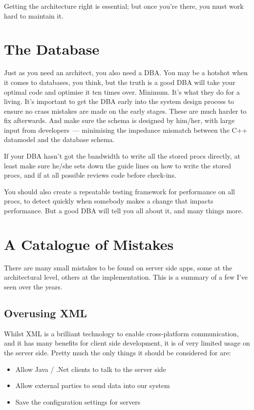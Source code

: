 \documentclass{book}
\begin{document}
Getting the architecture right is essential; but once you're there,
you must work hard to maintain it.

\section{The Database}

Just as you need an architect, you also need a DBA. You may be a
hotshot when it comes to databases, you think, but the truth is a good
DBA will take your optimal code and optimise it ten times
over. Minimum. It's what they do for a living. It's important to get
the DBA early into the system design process to ensure no crass
mistakes are made on the early stages. These are much harder to fix
afterwards. And make sure the schema is designed by him/her, with
large input from developers~--- minimising the impedance mismatch
between the C++ datamodel and the database schema.

If your DBA hasn't got the bandwidth to write all the stored procs
directly, at least make sure he/she sets down the guide lines on how
to write the stored procs, and if at all possible reviews code before
check-ins.

You should also create a repeatable testing framework for performance
on all procs, to detect quickly when somebody makes a change that
impacts performance. But a good DBA will tell you all about it, and
many things more.

\section{A Catalogue of Mistakes}

There are many small mistakes to be found on server side apps, some at
the architectural level, others at the implementation. This is a
summary of a few I've seen over the years.

\subsection{Overusing XML}

Whilst XML is a brilliant technology to enable cross-platform
communication, and it has many benefits for client side development,
it is of very limited usage on the server side. Pretty much the only
things it should be considered for are:

\begin{itemize}
\item Allow Java / .Net clients to talk to the server side
\item Allow external parties to send data into our system
\item Save the configuration settings for servers
\end{itemize}
\end{document}
